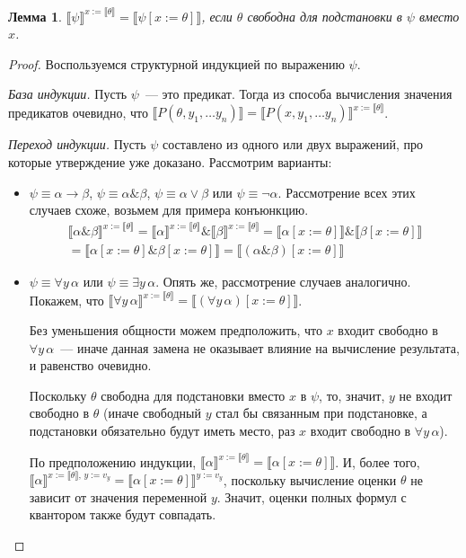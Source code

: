 \documentclass[a4paper,11pt]{article}
\newtheorem{lmm}[thm]{Лемма}
\theoremstyle{definition}
\newcommand{\sem}[2]{\llbracket #1 \rrbracket^{#2}}
\newcommand{\amp}{\mathbin{\&}}
\begin{document}
\begin{lmm}\label{lmm:subst}
$\sem{\psi}{x:=\llbracket\theta\rrbracket} = \llbracket\psi[x := \theta]\rrbracket$,
если $\theta$ свободна для подстановки в $\psi$ вместо $x$.
\end{lmm}
\begin{proof}
Воспользуемся структурной индукцией по выражению $\psi$.

\emph{База индукции.} Пусть $\psi$~--- это предикат. Тогда из способа вычисления
значения предикатов очевидно, что $\llbracket P(\theta, y_1, \dots y_n)\rrbracket
= \sem{P(x, y_1, \dots y_n)}{x:=\llbracket\theta\rrbracket}$.

\emph{Переход индукции.} Пусть $\psi$ составлено из одного или двух выражений,
про которые утверждение уже доказано. Рассмотрим варианты:
\begin{itemize}
\item $\psi \equiv \alpha \to \beta$, $\psi \equiv \alpha \amp \beta$,
  $\psi \equiv \alpha \vee \beta$ или $\psi \equiv \neg\alpha$. Рассмотрение всех
  этих случаев схоже, возьмем для примера конъюнкцию.
  \begin{multline*}
  \sem{\alpha \amp \beta}{x:=\llbracket\theta\rrbracket}
  = \sem{\alpha}{x:=\llbracket\theta\rrbracket} \amp \sem{\beta}{x:=\llbracket\theta\rrbracket}
  = \llbracket\alpha[x := \theta]\rrbracket \amp \llbracket\beta[x := \theta]\rrbracket\\
  = \llbracket\alpha[x := \theta] \amp \beta[x := \theta]\rrbracket
  = \llbracket(\alpha \amp \beta)[x := \theta]\rrbracket
  \end{multline*}
\item $\psi \equiv \forall y\,\alpha$ или $\psi \equiv \exists y\,\alpha$. Опять
  же, рассмотрение случаев аналогично. Покажем, что
  $\sem{\forall y\,\alpha}{x:=\llbracket\theta\rrbracket} =
  \llbracket(\forall y\,\alpha)[x := \theta]\rrbracket$.

  Без уменьшения общности можем предположить, что $x$ входит свободно в
  $\forall y\,\alpha$~--- иначе данная замена не оказывает влияние на вычисление
  результата, и равенство очевидно.

  Поскольку $\theta$ свободна для подстановки вместо $x$ в $\psi$, то, значит,
  $y$ не входит свободно в $\theta$ (иначе свободный $y$ стал бы связанным при
  подстановке, а подстановки обязательно будут иметь место, раз $x$ входит
  свободно в $\forall y\,\alpha$).

  По предположению индукции, $\sem{\alpha}{x:=\llbracket\theta\rrbracket} =
  \llbracket\alpha[x := \theta]\rrbracket$. И, более того,
  $\sem{\alpha}{x:=\llbracket\theta\rrbracket,\,y:=v_y} =
  \sem{\alpha[x := \theta]}{y:=v_y}$, поскольку вычисление оценки $\theta$ не
  зависит от значения переменной $y$. Значит, оценки полных формул с квантором
  также будут совпадать.
\end{itemize}
\end{proof}
\end{document}
